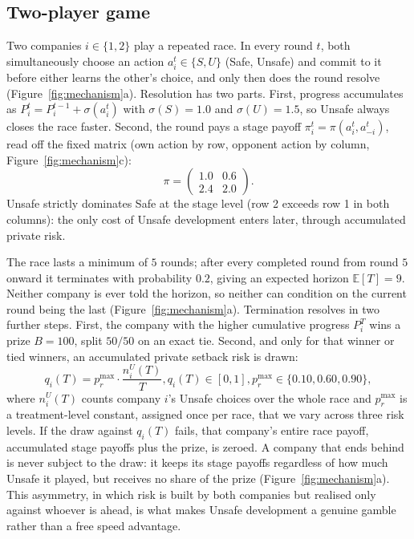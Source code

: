 \documentclass[sigconf,anonymous]{aamas}
\begin{document}
\subsection{Two-player game}
\label{sec:prelim-2p}

Two companies $i \in \{1,2\}$ play a repeated race. In every round $t$, both simultaneously choose an action $a_i^t \in \{S, U\}$ (Safe, Unsafe) and commit to it before either learns the other's choice, and only then does the round resolve (Figure~\ref{fig:mechanism}a). Resolution has two parts. First, progress accumulates as $P_i^t = P_i^{t-1}+\sigma(a_i^t)$ with $\sigma(S)=1.0$ and $\sigma(U)=1.5$, so Unsafe always closes the race faster. Second, the round pays a stage payoff $\pi_i^t=\pi(a_i^t,a_{-i}^t)$, read off the fixed matrix (own action by row, opponent action by column, Figure~\ref{fig:mechanism}c):
\begin{equation}
    \pi = \begin{pmatrix} 1.0 & 0.6 \\ 2.4 & 2.0 \end{pmatrix}.
    \label{eq:2p-matrix}
\end{equation}
Unsafe strictly dominates Safe at the stage level (row 2 exceeds row 1 in both columns): the only cost of Unsafe development enters later, through accumulated private risk.

The race lasts a minimum of $5$ rounds; after every completed round from round $5$ onward it terminates with probability $0.2$, giving an expected horizon $\mathbb{E}[T]=9$. Neither company is ever told the horizon, so neither can condition on the current round being the last (Figure~\ref{fig:mechanism}a). Termination resolves in two further steps. First, the company with the higher cumulative progress $P_i^T$ wins a prize $B=100$, split $50/50$ on an exact tie. Second, and only for that winner or tied winners, an accumulated private setback risk is drawn:
\begin{equation}
    q_i(T) = p_r^{\max} \cdot \frac{n_i^U(T)}{T}, q_i(T) \in [0,1], p_r^{\max}\in\{0.10,0.60,0.90\},
    \label{eq:risk}
\end{equation}
where $n_i^U(T)$ counts company $i$'s Unsafe choices over the whole race and $p_r^{\max}$ is a treatment-level constant, assigned once per race, that we vary across three risk levels. If the draw against $q_i(T)$ fails, that company's entire race payoff, accumulated stage payoffs plus the prize, is zeroed. A company that ends behind is never subject to the draw: it keeps its stage payoffs regardless of how much Unsafe it played, but receives no share of the prize (Figure~\ref{fig:mechanism}a). This asymmetry, in which risk is built by both companies but realised only against whoever is ahead, is what makes Unsafe development a genuine gamble rather than a free speed advantage.
\end{document}
